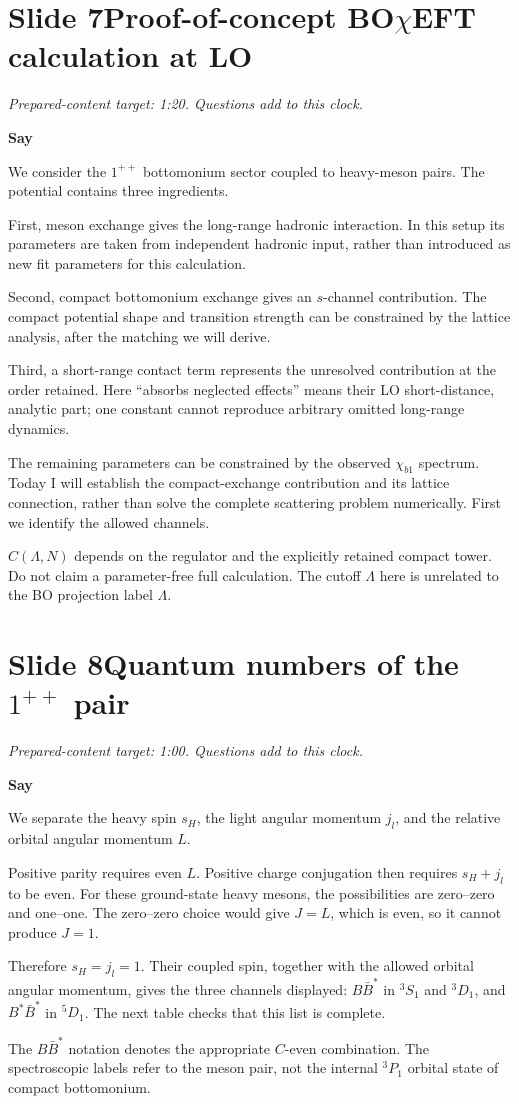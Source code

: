\documentclass[11pt,a4paper]{article}
\newcommand{\BBst}{B\bar B^*}
\newcommand{\BstBst}{B^*\bar B^*}
\newcommand{\cue}[1]{\begin{private}#1\end{private}}
\newenvironment{speech}{\par\textbf{Say}\par}{\par}
\newcommand{\slidenote}[3]{%
  \clearpage
  \pdfbookmark[1]{Slide #1}{slide-#1}%
  \section*{Slide #1\quad #2}
  \textit{Prepared-content target: #3. Questions add to this clock.}\par
}
\begin{document}
\slidenote{7}{Proof-of-concept BO$\chi$EFT calculation at LO}{1:20}
\begin{speech}
We consider the $1^{++}$ bottomonium sector coupled to heavy-meson pairs.
The potential contains three ingredients.

First, meson exchange gives the long-range hadronic interaction. In this
setup its parameters are taken from independent hadronic input, rather
than introduced as new fit parameters for this calculation.

Second, compact bottomonium exchange gives an $s$-channel contribution.
The compact potential shape and transition strength can be constrained
by the lattice analysis, after the matching we will derive.

Third, a short-range contact term represents the unresolved contribution
at the order retained. Here ``absorbs neglected effects'' means their LO
short-distance, analytic part; one constant cannot reproduce arbitrary
omitted long-range dynamics.

The remaining parameters can be constrained by the observed
$\chi_{b1}$ spectrum. Today I will establish the compact-exchange
contribution and its lattice connection, rather than solve the complete
scattering problem numerically. First we identify the allowed channels.
\end{speech}
\cue{$C(\Lambda,N)$ depends on the regulator and the explicitly retained
compact tower. Do not claim a parameter-free full calculation. The cutoff
$\Lambda$ here is unrelated to the BO projection label $\Lambda$.}

\slidenote{8}{Quantum numbers of the $1^{++}$ pair}{1:00}
\begin{speech}
We separate the heavy spin $s_H$, the light angular momentum $j_l$, and
the relative orbital angular momentum $L$.

Positive parity requires even $L$. Positive charge conjugation then
requires $s_H+j_l$ to be even. For these ground-state heavy mesons,
the possibilities are zero--zero and one--one. The zero--zero choice
would give $J=L$, which is even, so it cannot produce $J=1$.

Therefore $s_H=j_l=1$. Their coupled spin, together with the allowed
orbital angular momentum, gives the three channels displayed:
$\BBst$ in ${}^3S_1$ and ${}^3D_1$, and $\BstBst$ in ${}^5D_1$.
The next table checks that this list is complete.
\end{speech}
\cue{The $\BBst$ notation denotes the appropriate $C$-even combination.
The spectroscopic labels refer to the meson pair, not the internal
${}^3P_1$ orbital state of compact bottomonium.}
\end{document}
